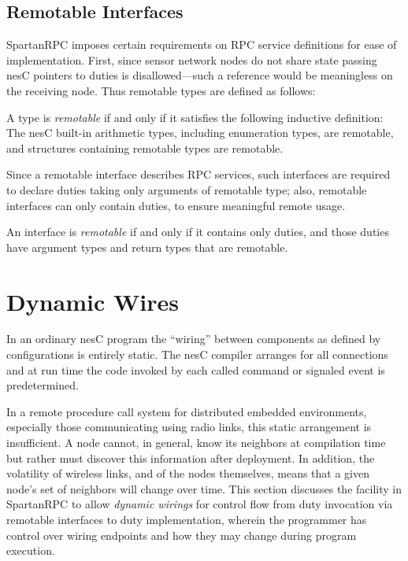 \subsection{Remotable Interfaces}
\label{section-remotable}

SpartanRPC imposes certain requirements on RPC service definitions for ease of implementation.
First, since sensor network nodes do not share state passing nesC pointers to duties is
disallowed---such a reference would be meaningless on the receiving node. Thus remotable types
are defined as follows:
\begin{definition}
  A type is \emph{remotable} if and only if it satisfies the following inductive definition: The
  nesC built-in arithmetic types, including enumeration types, are remotable, and structures
  containing remotable types are remotable.
\end{definition}
Since a remotable interface describes RPC services, such interfaces are required to declare
duties taking only arguments of remotable type; also, remotable interfaces can only contain
duties, to ensure meaningful remote usage.
\begin{definition}
  An interface is \emph{remotable} if and only if it contains only duties, and those duties have
  argument types and return types that are remotable.
\end{definition}

\section{Dynamic Wires}
\label{section-dynamic-wires}

In an ordinary nesC program the ``wiring'' between components as defined by configurations is
entirely static. The nesC compiler arranges for all connections and at run time the code invoked
by each called command or signaled event is predetermined.

In a remote procedure call system for distributed embedded environments, especially those
communicating using radio links, this static arrangement is insufficient. A node cannot, in
general, know its neighbors at compilation time but rather must discover this information after
deployment. In addition, the volatility of wireless links, and of the nodes themselves, means
that a given node's set of neighbors will change over time.  This section discusses the
facility in SpartanRPC to allow \emph{dynamic wirings} for control flow from duty invocation via
remotable interfaces to duty implementation, wherein the programmer has control over wiring
endpoints and how they may change during program execution.

